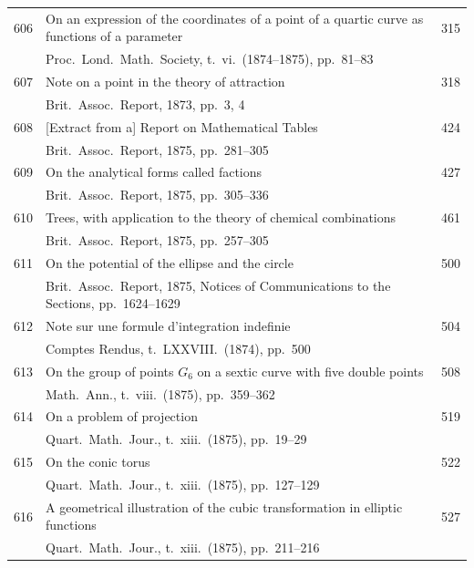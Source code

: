 \documentclass[11pt,a4paper]{book}
\begin{document}
\begin{longtable}{r @{. } p{4.8in} r}
606 & On an expression of the coordinates of a point of a quartic curve as functions of a parameter & 315 \\
  & Proc.\ Lond.\ Math.\ Society, t.\ vi.\ (1874--1875), pp.\ 81--83 & \\ 

607 & Note on a point in the theory of attraction & 318 \\
  & Brit.\ Assoc.\ Report, 1873, pp.\ 3, 4 & \\ 

608 & [Extract from a] Report on Mathematical Tables & 424 \\
  & Brit.\ Assoc.\ Report, 1875, pp.\ 281--305 & \\ 

609 & On the analytical forms called factions & 427 \\
  & Brit.\ Assoc.\ Report, 1875, pp.\ 305--336 & \\ 

610 & Trees, with application to the theory of chemical combinations & 461 \\
  & Brit.\ Assoc.\ Report, 1875, pp.\ 257--305 & \\ 

611 & On the potential of the ellipse and the circle & 500 \\
  & Brit.\ Assoc.\ Report, 1875, Notices of Communications to the Sections, pp.\ 1624--1629 & \\ 

612 & Note sur une formule d'integration indefinie & 504 \\
  & Comptes Rendus, t.\ LXXVIII.\ (1874), pp.\ 500 & \\ 

613 & On the group of points $G_6$ on a sextic curve with five double points & 508 \\
  & Math.\ Ann., t.\ viii.\ (1875), pp.\ 359--362 & \\ 

614 & On a problem of projection & 519 \\
  & Quart.\ Math.\ Jour., t.\ xiii.\ (1875), pp.\ 19--29 & \\ 

615 & On the conic torus & 522 \\
  & Quart.\ Math.\ Jour., t.\ xiii.\ (1875), pp.\ 127--129 & \\ 

616 & A geometrical illustration of the cubic transformation in elliptic functions & 527 \\
  & Quart.\ Math.\ Jour., t.\ xiii.\ (1875), pp.\ 211--216 & \\ 


\end{longtable}
\end{document}
